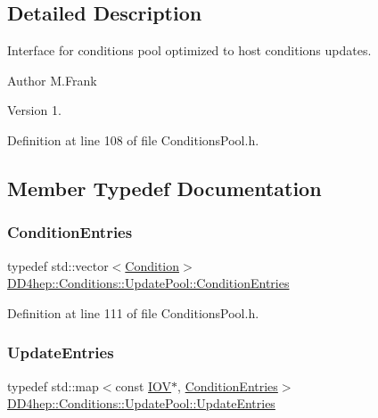 \subsection{Detailed Description}
Interface for conditions pool optimized to host conditions updates. 

\begin{DoxyAuthor}{Author}
M.\+Frank 
\end{DoxyAuthor}
\begin{DoxyVersion}{Version}
1. 
\end{DoxyVersion}


Definition at line 108 of file Conditions\+Pool.\+h.



\subsection{Member Typedef Documentation}
\hypertarget{class_d_d4hep_1_1_conditions_1_1_update_pool_ad6bcf36ae0a7dee0a08e1045d8612c6e}{}\label{class_d_d4hep_1_1_conditions_1_1_update_pool_ad6bcf36ae0a7dee0a08e1045d8612c6e} 
\subsubsection{\texorpdfstring{Condition\+Entries}{ConditionEntries}}
{\footnotesize\ttfamily typedef std\+::vector$<$\hyperlink{class_d_d4hep_1_1_conditions_1_1_condition}{Condition}$>$ \hyperlink{class_d_d4hep_1_1_conditions_1_1_update_pool_ad6bcf36ae0a7dee0a08e1045d8612c6e}{D\+D4hep\+::\+Conditions\+::\+Update\+Pool\+::\+Condition\+Entries}}



Definition at line 111 of file Conditions\+Pool.\+h.

\hypertarget{class_d_d4hep_1_1_conditions_1_1_update_pool_a1a578a7a025ded412da474be106dc780}{}\label{class_d_d4hep_1_1_conditions_1_1_update_pool_a1a578a7a025ded412da474be106dc780} 
\subsubsection{\texorpdfstring{Update\+Entries}{UpdateEntries}}
{\footnotesize\ttfamily typedef std\+::map$<$const \hyperlink{class_d_d4hep_1_1_i_o_v}{I\+OV}$\ast$, \hyperlink{class_d_d4hep_1_1_conditions_1_1_update_pool_ad6bcf36ae0a7dee0a08e1045d8612c6e}{Condition\+Entries}$>$ \hyperlink{class_d_d4hep_1_1_conditions_1_1_update_pool_a1a578a7a025ded412da474be106dc780}{D\+D4hep\+::\+Conditions\+::\+Update\+Pool\+::\+Update\+Entries}}



